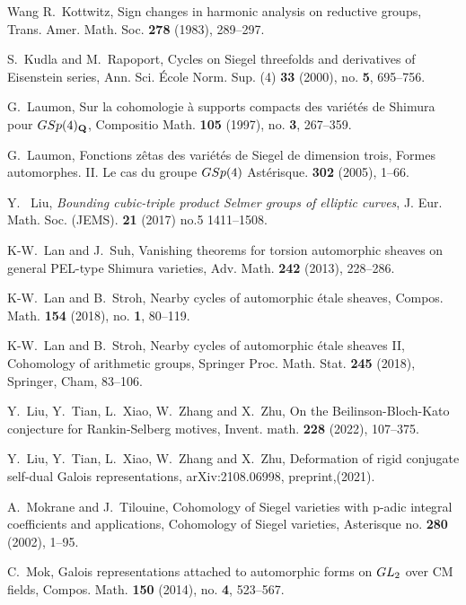 \documentclass[10pt]{amsart}
\numberwithin{equation}{section}
\theoremstyle{definition}
\begin{document}
\begin{thebibliography}{Wang}
R.~Kottwitz, {Sign changes in harmonic analysis on reductive groups},
               {Trans. Amer. Math. Soc.} {\bf 278} (1983), 289--297.

S.~Kudla and M.~Rapoport, {Cycles on Siegel threefolds and derivatives of {E}isenstein series}, {Ann. Sci. \'{E}cole Norm. Sup. (4)} {\bf 33} (2000), no. {\bf5}, 695--756. 

G.~Laumon, {Sur la cohomologie \`a supports compacts des vari\'{e}t\'{e}s de Shimura
   pour ${\rm GSp}(4)_{\bf Q}$}, {Compositio Math.} {\bf 105} (1997), no. {\bf 3}, 267--359.

G.~Laumon, {Fonctions z\^{e}tas des vari\'{e}t\'{e}s de Siegel de dimension trois}, {Formes automorphes. II. Le cas du groupe $\rm GSp(4)$} {Ast\'{e}risque.} {\bf 302} (2005), 1--66.   

Y.~ Liu, {\em Bounding cubic-triple product {S}elmer groups of elliptic curves}, 
J. Eur. Math. Soc. (JEMS). {\bf 21} (2017) no.5  1411--1508.

K-W.~Lan and J.~Suh, {Vanishing theorems for torsion automorphic sheaves on general {PEL}-type {S}himura varieties},
{Adv. Math.} {\bf242} (2013), 228--286. 
                              
    K-W.~Lan and B.~Stroh, {Nearby cycles of automorphic \'{e}tale sheaves},
               {Compos. Math.} {\bf154} (2018), no. {\bf1}, 80--119.    

    K-W.~Lan and B.~Stroh, {Nearby cycles of automorphic \'{e}tale sheaves II},
               {Cohomology of arithmetic groups, Springer Proc. Math. Stat.} {\bf245} (2018), Springer, Cham, 83--106.    
   
Y.~Liu, Y.~Tian, L.~Xiao, W.~Zhang and X.~Zhu, {On the Beilinson-Bloch-Kato conjecture for Rankin-Selberg motives}, {Invent. math.} {\bf 228} (2022), 107--375.

Y.~Liu, Y.~Tian, L.~Xiao, W.~Zhang and X.~Zhu, {Deformation of rigid conjugate self-dual Galois representations}, {arXiv:2108.06998}, preprint,(2021). 

A.~Mokrane and J.~Tilouine, {Cohomology of Siegel varieties with p-adic integral coefficients and applications}, {Cohomology of Siegel varieties},  {Asterisque} no. {\bf280} (2002), 1--95.

C.~Mok, {Galois representations attached to automorphic forms on {${\rm GL}_2$} over {CM} fields}, {Compos. Math.} {\bf150} (2014), no. {\bf 4}, 523--567.


\end{thebibliography}
\end{document}
